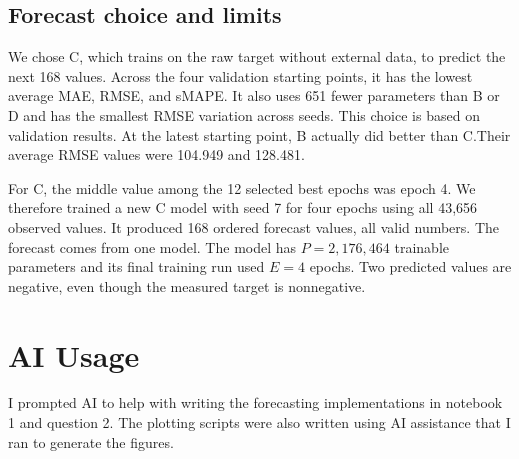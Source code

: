 \documentclass[11pt,a4paper]{article}
\begin{document}
\subsection*{Forecast choice and limits}

We chose C, which trains on the raw target without external data, to predict
the next 168 values. Across the four validation starting points, it has the
lowest average MAE, RMSE, and sMAPE. It also uses 651 fewer parameters than B
or D and has the smallest RMSE variation across seeds. This choice is based
on validation results. At the latest starting point, B actually did better than C.Their average
RMSE values were 104.949 and 128.481.

For C, the middle value among the 12 selected best epochs was epoch 4.
We therefore trained a new C model with seed 7 for four epochs using all
43,656 observed values. It produced 168 ordered forecast values, all valid
numbers. The forecast comes from one model.
The model has $P=2{,}176{,}464$ trainable parameters and its final training
run used $E=4$ epochs. Two predicted values are negative, even though the
measured target is nonnegative. 


\section*{AI Usage}
I prompted AI to help with writing the forecasting implementations in notebook 1 and question 2. 
The plotting scripts were also written using AI assistance that I ran to generate the figures.
\end{document}
